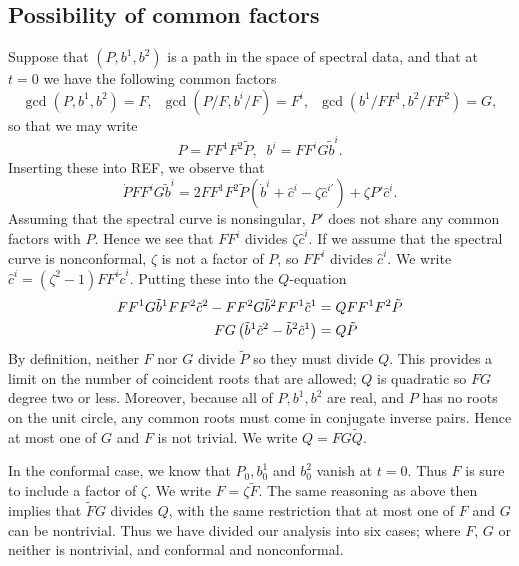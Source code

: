 \subsection{Possibility of common factors}
Suppose that $(P,b^1,b^2)$ is a path in the space of spectral data, and that at $t=0$ we have the following common factors
\[
\gcd(P,b^1,b^2) = F,\;\; \gcd(P/F,b^i/F) = F^i,\;\; \gcd(b^1/FF^1, b^2/FF^2) = G,
\]
so that we may write
\[
P = F F^1 F^2 \tilde{P},\;\; b^i = F F^i G \tilde{b}^i.
\]
Inserting these into REF, we observe that
\[
\dot{P} F F^i G \tilde{b}^i = 2 F F^1 F^2 \tilde{P} (\dot{b}^i + \hat{c}^i - ζ\hat{c}^{i\prime}) + ζP' \hat{c}^i.
\]
Assuming that the spectral curve is nonsingular, $P'$ does not share any common factors with $P$. Hence we see that $FF^i$ divides $ζ\hat{c}^i$. If we assume that the spectral curve is nonconformal, $ζ$ is not a factor of $P$, so $FF^i$ divides $\hat{c}^i$. We write $\hat{c}^i = (ζ^2-1)FF^i\tilde{c}^i$. Putting these into the $Q$-equation
\begin{align*}
FF^1G\tilde{b}^1 FF^2\tilde{c}^2 - FF^2G\tilde{b}^2 FF^1\tilde{c}^1 &= Q FF^1F^2\tilde{P} \\
FG\left(\tilde{b}^1 \tilde{c}^2 - \tilde{b}^2 \tilde{c}^1\right) &= Q \tilde{P}
\end{align*}
By definition, neither $F$ nor $G$ divide $\tilde{P}$ so they must divide $Q$. This provides a limit on the number of coincident roots that are allowed; $Q$ is quadratic so $FG$ degree two or less. Moreover, because all of $P,b^1,b^2$ are real, and $P$ has no roots on the unit circle, any common roots must come in conjugate inverse pairs. Hence at most one of $G$ and $F$ is not trivial. We write $Q = FG\tilde{Q}$.

In the conformal case, we know that $P_0, b^1_0$ and $b^2_0$ vanish at $t=0$. Thus $F$ is sure to include a factor of $ζ$. We write $F = ζ\tilde{F}$. The same reasoning as above then implies that $\tilde{F}G$ divides $Q$, with the same restriction that at most one of $F$ and $G$ can be nontrivial. Thus we have divided our analysis into six cases; where $F$, $G$ or neither is nontrivial, and conformal and nonconformal.
